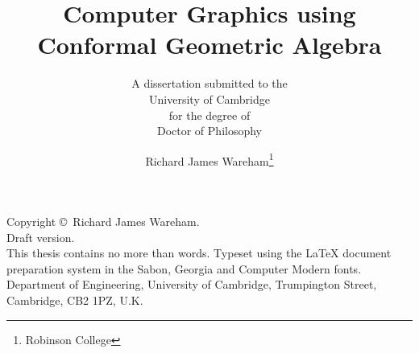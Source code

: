 \documentclass[a4paper,oneside,12pt,sabonnumbers]{RJWThesis}
\begin{document}
\begin{frontmatter}
\renewcommand{\baselinestretch}{1.2}\selectfont
\title{Computer Graphics using Conformal Geometric Algebra}
\subtitle{A dissertation submitted to the\\{\sc University of 
    Cambridge}\\for the degree of\\{\sc Doctor of Philosophy}}
\author{Richard James Wareham\thanks{Robinson College}}
\maketitle
\cleardoublepage

\vspace*{0.2\textheight}
\noindent Copyright \copyright \number\year\ Richard James Wareham.
\vspace*{1em}\\
\noindent Draft version.\\
\noindent This thesis contains no more than  words.
\vfill
\noindent Typeset using the \LaTeX{} document preparation system
in the Sabon, Georgia and Computer Modern fonts.
\vfill
{}\newline
Department of Engineering,\newline
University of Cambridge,\newline
Trumpington Street,\newline
Cambridge, CB2 1PZ, U.K.
\cleardoublepage

\dedication{Dedication}

\tableofcontents
\listoffigures
\listoftables
\end{frontmatter}

\begin{mainmatter}
\renewcommand{\baselinestretch}{1.75}\selectfont










\end{mainmatter}


\begin{backmatter}

\end{backmatter}
\end{document}
